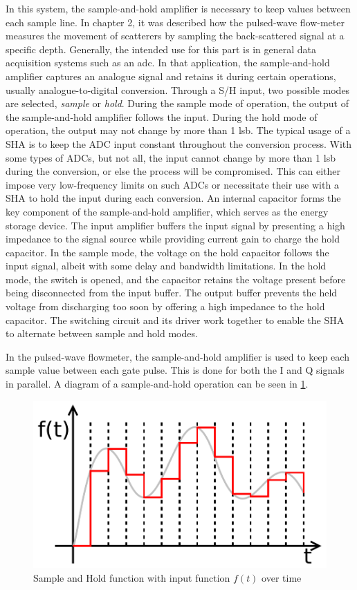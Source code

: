 In this system, the sample-and-hold amplifier is necessary to keep values between each sample line. In chapter 2, it was described how the pulsed-wave flow-meter measures the movement of scatterers by sampling the back-scattered signal at a specific depth. Generally, the intended use for this part is in general data acquisition systems such as an \gls{adc}. In that application, the sample-and-hold amplifier captures an analogue signal and retains it during certain operations, usually analogue-to-digital conversion. Through a S/H input, two possible modes are selected, \textit{sample} or \textit{hold}. During the sample mode of operation, the output of the sample-and-hold amplifier follows the input. During the hold mode of operation, the output may not change by more than 1 \gls{lsb}. The typical usage of a SHA is to keep the ADC input constant throughout the conversion process. With some types of ADCs, but not all, the input cannot change by more than 1 \gls{lsb} during the conversion, or else the process will be compromised. This can either impose very low-frequency limits on such ADCs or necessitate their use with a SHA to hold the input during each conversion. An internal capacitor forms the key component of the sample-and-hold amplifier, which serves as the energy storage device. The input amplifier buffers the input signal by presenting a high impedance to the signal source while providing current gain to charge the hold capacitor. In the sample mode, the voltage on the hold capacitor follows the input signal, albeit with some delay and bandwidth limitations. In the hold mode, the switch is opened, and the capacitor retains the voltage present before being disconnected from the input buffer. The output buffer prevents the held voltage from discharging too soon by offering a high impedance to the hold capacitor. The switching circuit and its driver work together to enable the SHA to alternate between sample and hold modes.

In the pulsed-wave flowmeter, the sample-and-hold amplifier is used to keep each sample value between each gate pulse. This is done for both the I and Q signals in parallel. A diagram of a sample-and-hold operation can be seen in \cref{fig:3_sha_function}.

\begin{figure}[htbp]
	\centering
	\includegraphics[width=.8\textwidth]{Figures/3_sample_hold_amplifier_quantization.pdf}
	\caption[Sample and Hold function with input function $f(t)$ over time]{Sample and Hold function with input function $f(t)$ over time \cite{sha_pic}}
	\label{fig:3_sha_function}
\end{figure}

